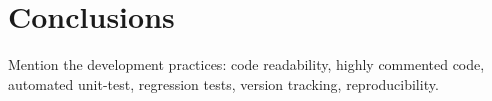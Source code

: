 \section{Conclusions}

Mention the development practices: code readability, highly commented code, automated unit-test, regression tests, version tracking, reproducibility.
